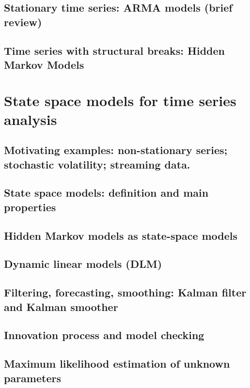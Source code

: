 \documentclass[dvipsnames,12pt]{book}
\begin{document}
    \chapter[ARMA models]{Stationary time series: ARMA models (brief review)}

    \chapter[Hidden Markov Models]{Time series with structural breaks: Hidden Markov Models}
    
\part{State space models for time series analysis}

    \chapter[Non-stationary series; stochastic volatility; streaming data]{Motivating examples: non-stationary series; stochastic volatility; streaming data.}

    \chapter[State space models]{State space models: definition and main properties}

    \chapter{Hidden Markov models as state-space models}

    \chapter{Dynamic linear models (DLM)}

    \chapter[Kalman filter and Kalman smoother]{Filtering, forecasting, smoothing: Kalman filter and Kalman smoother}

    \chapter{Innovation process and model checking}

    \chapter[MLE of unknown parameter]{Maximum likelihood estimation of unknown parameters}
\end{document}
